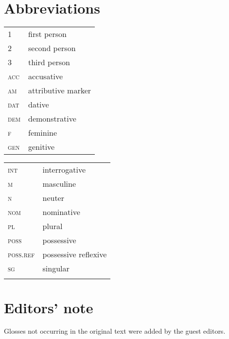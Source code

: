 \documentclass[output=paper,colorlinks,citecolor=brown]{langscibook}
\begin{document}
\section*{Abbreviations}
\begin{tabularx}{.5\textwidth}{@{}lQ}
\textsc{1}&first person\\
\textsc{2}&second person\\
\textsc{3}&third person\\
\textsc{acc}&accusative\\
\textsc{am}&attributive marker\\
\textsc{dat}&dative\\
\textsc{dem}&demonstrative\\
\textsc{f}&feminine\\
\textsc{gen}&genitive\\
\end{tabularx}%
\begin{tabularx}{.5\textwidth}{lQ@{}}
\textsc{int}&interrogative\\
\textsc{m}&masculine\\
\textsc{n}&neuter\\
\textsc{nom}&nominative\\
\textsc{pl}&plural\\
\textsc{poss}&possessive\\
\textsc{poss.ref}&possessive reflexive\\
\textsc{sg}&singular\\
&\\ %
\end{tabularx}

\section*{Editors' note}

 Glosses not occurring in the original text were added by the guest editors.

\printbibliography[heading=subbibliography,notkeyword=this]
\end{document}
